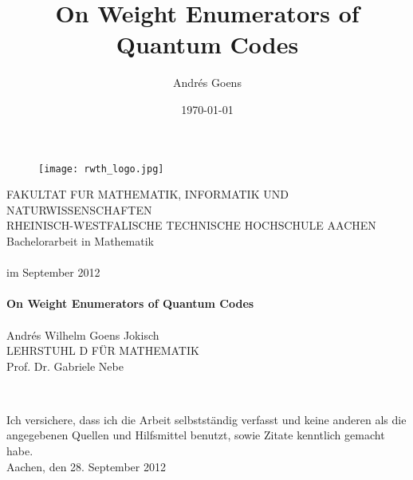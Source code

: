 \documentclass[12pt,a4paper,BCOR15mm,twoside,DIV12]{article}
\title{On Weight Enumerators of Quantum Codes}
\author{Andr\'{e}s Goens}
\date{\today}
\theoremstyle{definition}
\begin{document}
\begin{titlepage}
\clearpage
\thispagestyle{empty}
\begin{figure}[h]
  \centering
  \texttt{[image: rwth\_logo.jpg]}
\end{figure}

\begin{center}
\Large
FAKULTAT FUR MATHEMATIK, INFORMATIK 
UND NATURWISSENSCHAFTEN \\
\vspace{1cm}
\large
RHEINISCH-WESTFALISCHE TECHNISCHE HOCHSCHULE AACHEN\\
\vspace{1cm}
Bachelorarbeit in Mathematik\\
\vspace{1cm}
\\
im September 2012\\
\vspace{1cm}
\\

\LARGE
\textbf{On Weight Enumerators of Quantum Codes} \\
\vspace{2cm}
\Large
\\
\Large
Andr\'{e}s Wilhelm Goens Jokisch\\
\vspace{3cm}
LEHRSTUHL D FÜR MATHEMATIK
\\
Prof. Dr$.$ Gabriele Nebe
\end{center}\

\end{titlepage}
\clearpage \newpage
\thispagestyle{empty}
\mbox{}
\clearpage \newpage
\newpage
\thispagestyle{empty}
Ich versichere, dass ich die Arbeit selbstständig verfasst und keine anderen als die 
angegebenen Quellen und Hilfsmittel benutzt, sowie Zitate kenntlich gemacht habe. 
\newline
\newline
\newline 
\\
\hfill Aachen, den 28. September 2012
\\
\clearpage \newpage
\thispagestyle{empty}
\mbox{}
\clearpage \newpage
\setcounter{page}{1}
\tableofcontents
{}
\clearpage \newpage
\end{document}

